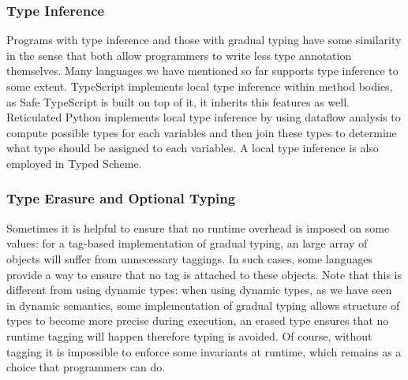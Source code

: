 \subsubsection{Type Inference}

Programs with type inference and those with gradual typing have some similarity in the sense
that both allow programmers to write less type annotation themselves.
Many languages we have mentioned so far supports type inference to some extent.
TypeScript implements local type inference within method bodies,
as Safe TypeScript is built on top of it, it inherits this features as well.
Reticulated Python implements local type inference by
using dataflow analysis to compute possible types for each variables
and then join these types to determine what type should be assigned to each variables.
A local type inference is also employed in Typed Scheme.





\subsubsection{Type Erasure and Optional Typing}

Sometimes it is helpful to ensure that no runtime overhead is imposed
on some values: for a tag-based implementation of gradual typing,
an large array of objects will suffer from unnecessary taggings.
In such cases, some languages provide a way to ensure that no tag is attached
to these objects.
Note that this is different from using dynamic types:
when using dynamic types, as we have seen in dynamic semantics,
some implementation of gradual typing allows structure of types to become more precise
during execution, an erased type ensures that no runtime tagging will happen
therefore typing is avoided.
Of course, without tagging it is impossible to enforce some invariants at runtime,
which remains as a choice that programmers can do.

